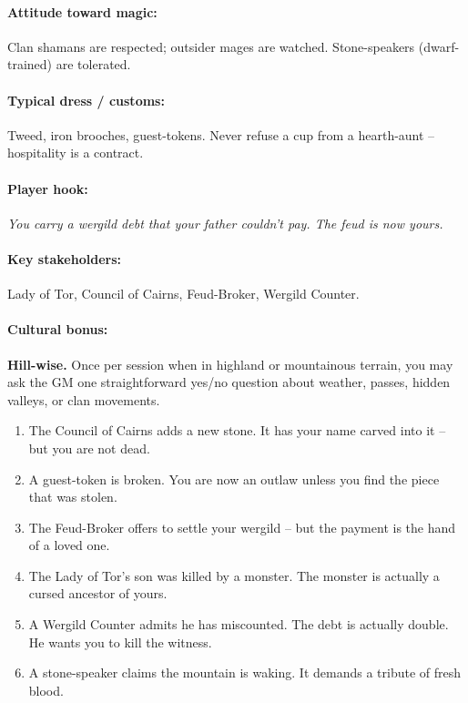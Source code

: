 \paragraph{Attitude toward magic:} Clan shamans are respected; outsider mages are watched. Stone-speakers (dwarf-trained) are tolerated.

\paragraph{Typical dress / customs:} Tweed, iron brooches, guest-tokens. Never refuse a cup from a hearth-aunt -- hospitality is a contract.

\paragraph{Player hook:} \emph{You carry a wergild debt that your father couldn't pay. The feud is now yours.}

\paragraph{Key stakeholders:} Lady of Tor, Council of Cairns, Feud-Broker, Wergild Counter.

\paragraph{Cultural bonus:} \textbf{Hill-wise.} Once per session when in highland or mountainous terrain, you may ask the GM one straightforward yes/no question about weather, passes, hidden valleys, or clan movements.

\begin{tcolorbox}[colback=gray!5!white, colframe=gray!70!black, title=Ubral Mini-Generator (d6),breakable]
\begin{enumerate}
\item The Council of Cairns adds a new stone. It has your name carved into it -- but you are not dead.
\item A guest-token is broken. You are now an outlaw unless you find the piece that was stolen.
\item The Feud-Broker offers to settle your wergild -- but the payment is the hand of a loved one.
\item The Lady of Tor's son was killed by a monster. The monster is actually a cursed ancestor of yours.
\item A Wergild Counter admits he has miscounted. The debt is actually double. He wants you to kill the witness.
\item A stone-speaker claims the mountain is waking. It demands a tribute of fresh blood.
\end{enumerate}
\end{tcolorbox}

